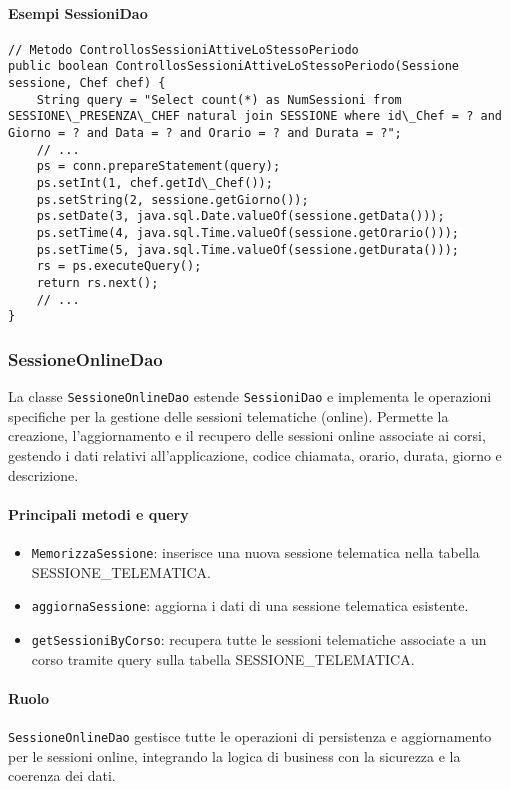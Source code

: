 \paragraph{Esempi SessioniDao}
\begin{verbatim}
// Metodo ControllosSessioniAttiveLoStessoPeriodo
public boolean ControllosSessioniAttiveLoStessoPeriodo(Sessione sessione, Chef chef) {
    String query = "Select count(*) as NumSessioni from SESSIONE\_PRESENZA\_CHEF natural join SESSIONE where id\_Chef = ? and Giorno = ? and Data = ? and Orario = ? and Durata = ?";
    // ...
    ps = conn.prepareStatement(query);
    ps.setInt(1, chef.getId\_Chef());
    ps.setString(2, sessione.getGiorno());
    ps.setDate(3, java.sql.Date.valueOf(sessione.getData()));
    ps.setTime(4, java.sql.Time.valueOf(sessione.getOrario()));
    ps.setTime(5, java.sql.Time.valueOf(sessione.getDurata()));
    rs = ps.executeQuery();
    return rs.next();
    // ...
}
\end{verbatim}

\subsubsection{SessioneOnlineDao}
La classe \texttt{SessioneOnlineDao} estende \texttt{SessioniDao} e implementa le operazioni specifiche per la gestione delle sessioni telematiche (online). Permette la creazione, l'aggiornamento e il recupero delle sessioni online associate ai corsi, gestendo i dati relativi all'applicazione, codice chiamata, orario, durata, giorno e descrizione.

\paragraph{Principali metodi e query}
\begin{itemize}
    \item \texttt{MemorizzaSessione}: inserisce una nuova sessione telematica nella tabella SESSIONE\_TELEMATICA.
    \item \texttt{aggiornaSessione}: aggiorna i dati di una sessione telematica esistente.
    \item \texttt{getSessioniByCorso}: recupera tutte le sessioni telematiche associate a un corso tramite query sulla tabella SESSIONE\_TELEMATICA.
\end{itemize}

\paragraph{Ruolo}
\texttt{SessioneOnlineDao} gestisce tutte le operazioni di persistenza e aggiornamento per le sessioni online, integrando la logica di business con la sicurezza e la coerenza dei dati.

